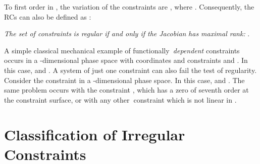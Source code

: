 \documentclass[a4paper,thmsa,11pt]{article}
\begin{document}
To first order in \coordHE{}, the variation of the constraints are \coordHE{}, where \coordHE{}. Consequently, the
RCs can also be defined as \cite{Henneaux-Teitelboim}:\medskip

\emph{The set of constraints }\coordHE{} \emph{is regular if and
only if the Jacobian }\coordHE{} \emph{has maximal rank: }\coordHE{}%
.\medskip

A simple classical mechanical example of functionally\emph{\ dependent}
constraints occurs in a \coordHE{}-dimensional phase space with coordinates \coordHE{} and constraints \coordHE{} and \coordHE{}. In this case, \coordHE{} and \coordHE{}. A system of
just one constraint can also fail the test of regularity. Consider the
constraint \coordHE{} in a \coordHE{}-dimensional phase space. In this
case, \coordHE{} and \coordHE{}. The same problem occurs
with the constraint \coordHE{}, which has a zero of seventh order at
the constraint surface, or with any other\textbf{\ }constraint which is not
linear in \coordHE{}.


\section{Classification of Irregular Constraints}
\end{document}
